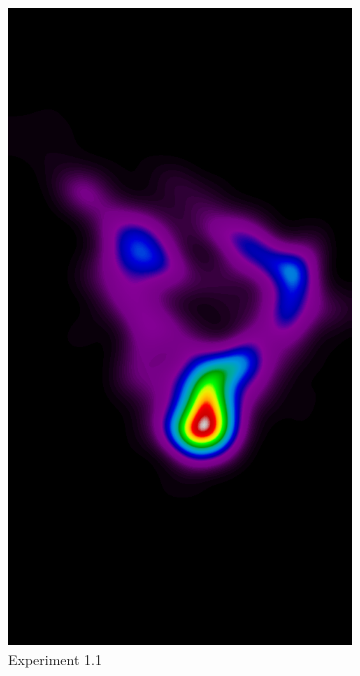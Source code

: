 \begin{figure}[h!]
	\centering
	\begin{subfigure}{0.195\textwidth}
		\centering
			\includegraphics[width=\textwidth]{plots/examples/example5_probs_1_1.png}
		\caption{Experiment 1.1}
    \end{subfigure}
	\begin{subfigure}{0.195\textwidth}
		\centering

\end{subfigure}
\end{figure}
